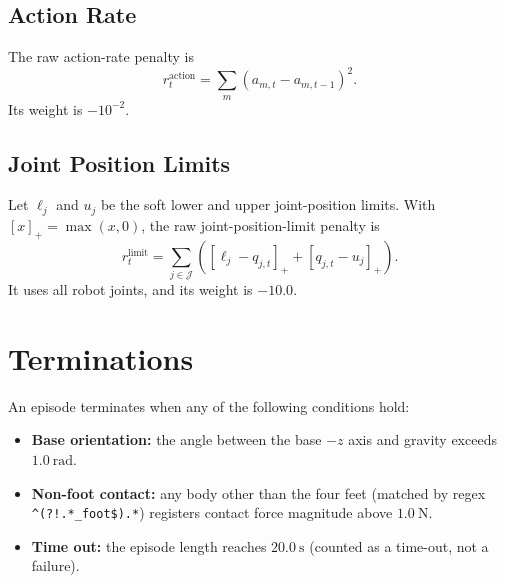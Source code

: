 \documentclass[11pt, a4paper]{article}
\begin{document}
\subsection{Action Rate}

The raw action-rate penalty is
\begin{equation}
    r^{\mathrm{action}}_t =
    \sum_{m}
    \left(
        a_{m,t} - a_{m,t-1}
    \right)^2.
\end{equation}
Its weight is $-10^{-2}$.

\subsection{Joint Position Limits}

Let $\ell_j$ and $u_j$ be the soft lower and upper joint-position limits. With
$[x]_+ = \max(x,0)$, the raw joint-position-limit penalty is
\begin{equation}
    r^{\mathrm{limit}}_t =
    \sum_{j \in \mathcal{J}}
    \left(
        [\ell_j - q_{j,t}]_+
        +
        [q_{j,t} - u_j]_+
    \right).
\end{equation}
It uses all robot joints, and its weight is $-10.0$.

\section{Terminations}

An episode terminates when any of the following conditions hold:
\begin{itemize}
    \item \textbf{Base orientation:} the angle between the base $-z$ axis and
    gravity exceeds $1.0\ \mathrm{rad}$.
    \item \textbf{Non-foot contact:} any body other than the four feet
    (matched by regex \texttt{\^{}(?!.*\_foot\$).*}) registers contact force
    magnitude above $1.0\ \mathrm{N}$.
    \item \textbf{Time out:} the episode length reaches
    $20.0\ \mathrm{s}$ (counted as a time-out, not a failure).
\end{itemize}
\end{document}
